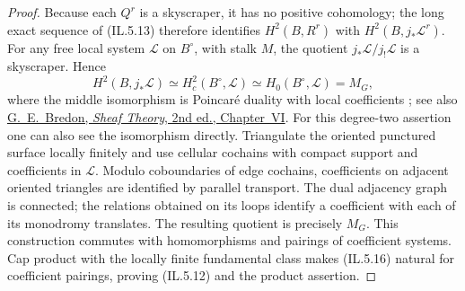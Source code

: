 \begin{proof}
Because each \(Q^r\) is a skyscraper, it has no positive cohomology; the
long exact sequence of (IL.5.13) therefore identifies
\(H^2(B,R^r)\) with \(H^2(B,j_*\mathcal L^r)\).
For any free local system \(\mathcal L\) on \(B^\circ\), with stalk \(M\),
the quotient \(j_*\mathcal L/j_!\mathcal L\) is a skyscraper.  Hence
\[
 H^2(B,j_*\mathcal L)\simeq H_c^2(B^\circ,\mathcal L)\simeq
 H_0(B^\circ,\mathcal L)=M_G,
\tag{IL.5.16}
\]
where the middle isomorphism is Poincar\'e duality with local coefficients
\cite[\S3.H]{Hatcher2002}; see also
\href{https://doi.org/10.1007/978-1-4612-0647-7}{G.~E.~Bredon,
\emph{Sheaf Theory}, 2nd ed., Chapter~VI}.
For this degree-two assertion one can also see the isomorphism directly.
Triangulate the oriented punctured surface locally finitely and use cellular
cochains with compact support and coefficients in $\mathcal L$. Modulo
coboundaries of edge cochains, coefficients on adjacent oriented triangles
are identified by parallel transport. The dual adjacency graph is connected;
the relations obtained on its loops identify a coefficient with each of its
monodromy translates. The resulting quotient is precisely $M_G$. This
construction commutes with homomorphisms and pairings of coefficient systems.
Cap product with the locally finite fundamental class makes (IL.5.16) natural
for coefficient pairings, proving (IL.5.12) and the product assertion.


\end{proof}

